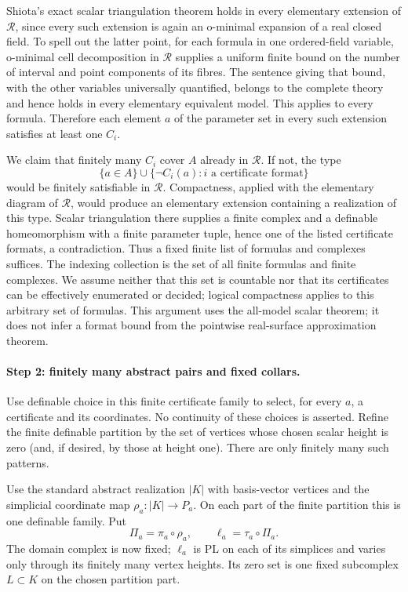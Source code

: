 Shiota's exact scalar triangulation theorem holds in every elementary
extension of $\mathcal R$, since every such extension is again an
o-minimal expansion of a real closed field. To spell out the latter point,
for each formula in one ordered-field variable, o-minimal cell decomposition
in $\mathcal R$ supplies a uniform finite bound on the number of interval
and point components of its fibres. The sentence giving that bound, with
the other variables universally quantified, belongs to the complete theory
and hence holds in every elementary equivalent model. This applies to
every formula. Therefore each element $a$ of the parameter set in every
such extension satisfies at least one $C_i$.

We claim that finitely many $C_i$ cover $A$ already in $\mathcal R$.
If not, the type
\[
 \{a\in A\}\cup\{\neg C_i(a): i\text{ a certificate format}\}
 \tag{US.3}
\]
would be finitely satisfiable in $\mathcal R$. Compactness, applied with
the elementary diagram of $\mathcal R$, would produce an elementary
extension containing a realization of this type. Scalar triangulation
there supplies a finite complex and a definable homeomorphism with a
finite parameter tuple, hence one of the listed certificate formats,
a contradiction. Thus a fixed finite list of formulas and complexes
suffices. The indexing collection is the set of all finite formulas and
finite complexes. We assume neither that this set is countable nor that
its certificates can be effectively enumerated or decided; logical
compactness applies to this arbitrary set of formulas. This argument
uses the all-model scalar theorem; it does not
infer a format bound from the pointwise real-surface approximation theorem.

\paragraph{Step 2: finitely many abstract pairs and fixed collars.}
Use definable choice in this finite certificate family to select, for every
$a$, a certificate and its coordinates. No continuity of these choices is
asserted. Refine the finite definable partition by the set of vertices
whose chosen scalar height is zero (and, if desired, by those at height
one). There are only finitely many such patterns.

Use the standard abstract realization $|K|$ with basis-vector vertices and
the simplicial coordinate map $\rho_a:|K|\to P_a$. On each part of the
finite partition this is one definable family. Put
\[
 \Pi_a=\pi_a\circ\rho_a,
 \qquad \ell_a=\tau_a\circ\Pi_a.
\]
The domain complex is now fixed; $\ell_a$ is PL on each of its simplices
and varies only through its finitely many vertex heights. Its zero set is
one fixed subcomplex $L\subset K$ on the chosen partition part.

